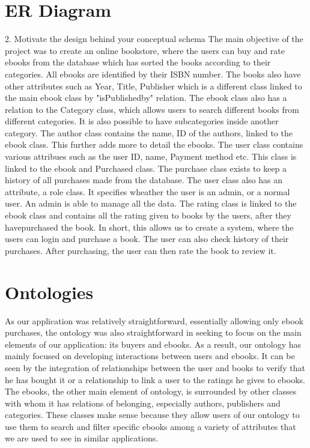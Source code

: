 \documentclass[a4paper,12pt]{article}
\begin{document}
\section{ER Diagram}
2. Motivate the design behind your conceptual schema
The main objective of the project was to create an online bookstore, where the users can buy and rate ebooks from the database which has sorted the books according to their categories.
All ebooks are identified by their ISBN number. The books also have other attributes such as Year, Title, Publisher which is a different class linked to the main ebook class by "isPublishedby" relation. The ebook class also has a relation to the Category class, which allows users to search different books from different categories. It is also possible to have subcategories inside another category. The author class contains the name, ID of the authors, linked to the ebook class. This further adds more to detail the ebooks.
The user class contains various attribues such as the user ID, name, Payment method etc. This class is linked to the ebook and Purchased class. The purchase class exists to keep a history of all purchases made from the database. The user class also has an attribute, a role class. It specifies wheather the user is an admin, or a normal user. An admin is able to manage all the data. 
The rating class is linked to the ebook class and contains all the rating given to books by the users, after they havepurchased the book.
In short, this allows us to create a system, where the users can login and purchase a book. The user can also check history of their purchases. After purchasing, the user can then rate the book to review it.

\section{Ontologies}
As our application was relatively straightforward, essentially allowing only ebook purchases, the ontology was also straightforward in seeking to focus on the main elements of our application: its buyers and ebooks. As a result, our ontology has mainly focused on developing interactions between users and ebooks. It can be seen by the integration of relationships between the user and books to verify that he has bought it or a relationship to link a user to the ratings he gives to ebooks. The ebooks, the other main element of ontology, is surrounded by other classes with whom it has relations of belonging, especially authors, publishers and categories. These classes make sense because they allow users of our ontology to use them to search and filter specific ebooks among a variety of attributes that we are used to see in similar applications.
\end{document}
